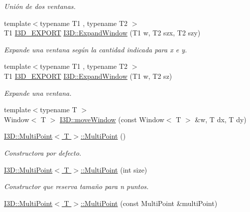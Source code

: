\begin{DoxyCompactItemize}
\begin{DoxyCompactList}\small\item\em Unión de dos ventanas. \end{DoxyCompactList}\item 
{\footnotesize template$<$typename T1 , typename T2 $>$ }\\T1 \hyperlink{defs_8h_a83f373279ee1ca96b4003c673142ec1d}{I3\+D\+\_\+\+E\+X\+P\+O\+RT} \hyperlink{group___geometric_entities_gae0d2f7fe0786b2ae52a92188c0449718}{I3\+D\+::\+Expand\+Window} (T1 w, T2 szx, T2 szy)
\begin{DoxyCompactList}\small\item\em Expande una ventana según la cantidad indicada para x e y. \end{DoxyCompactList}\item 
{\footnotesize template$<$typename T1 , typename T2 $>$ }\\T1 \hyperlink{defs_8h_a83f373279ee1ca96b4003c673142ec1d}{I3\+D\+\_\+\+E\+X\+P\+O\+RT} \hyperlink{group___geometric_entities_ga4ae38f1a99f61c043ae970b0c881dab7}{I3\+D\+::\+Expand\+Window} (T1 w, T2 sz)
\begin{DoxyCompactList}\small\item\em Expande una ventana. \end{DoxyCompactList}\item 
{\footnotesize template$<$typename T $>$ }\\Window$<$ T $>$ \hyperlink{group___geometric_entities_ga5893c61910bdaf13dcbd435f1914d868}{I3\+D\+::move\+Window} (const Window$<$ T $>$ \&w, T dx, T dy)
\item 
\hyperlink{group___geometric_entities_ga15cd19a3ddf5a39c3154efe440dde6c7}{I3\+D\+::\+Multi\+Point$<$ T $>$\+::\+Multi\+Point} ()
\begin{DoxyCompactList}\small\item\em Constructora por defecto. \end{DoxyCompactList}\item 
\hyperlink{group___geometric_entities_ga5581044092b6db2870f35347c8af5b73}{I3\+D\+::\+Multi\+Point$<$ T $>$\+::\+Multi\+Point} (int size)
\begin{DoxyCompactList}\small\item\em Constructor que reserva tamaño para n puntos. \end{DoxyCompactList}\item 
\hyperlink{group___geometric_entities_gaadc33d9d15e6fe63040915f1f39d9b40}{I3\+D\+::\+Multi\+Point$<$ T $>$\+::\+Multi\+Point} (const Multi\+Point \&multi\+Point)

\end{DoxyCompactItemize}
